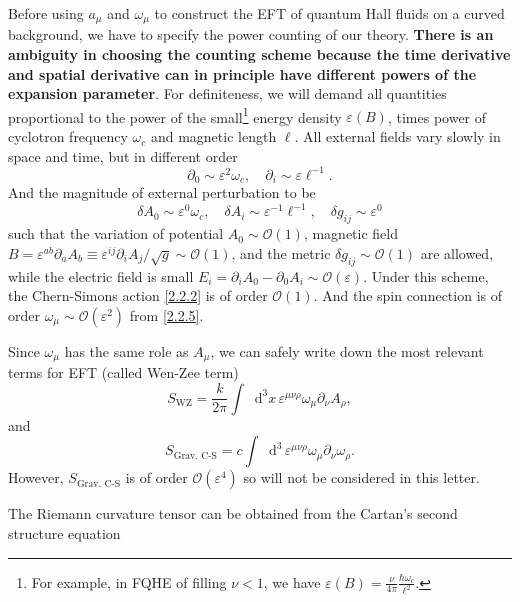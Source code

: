 \documentclass[10pt,nofootinbib,letterpaper]{revtex4}
\newcommand*\dd{\mathop{}\!\mathrm{d}}
\begin{document}
		\indent Before using $a_\mu$ and $\omega_\mu$ to construct the EFT of quantum Hall fluids on a curved background, we have to specify the power counting of our theory. \textbf{There is an ambiguity in choosing the counting scheme because the time derivative and spatial derivative can in principle have different powers of the expansion parameter}. For definiteness, we will demand all quantities proportional to the power of the small\footnote{For example, in FQHE of filling $\nu<1$, we have $\varepsilon(B)=\frac{\nu}{4\pi}\frac{\hbar\omega_c}{\ell^2}$.} energy density $\varepsilon(B)$, times power of cyclotron frequency $\omega_c$ and magnetic length $\ell$. All external fields vary slowly in space and time, but in different order
		\begin{equation*}
			\partial_0\sim \varepsilon^2\omega_c, \quad\partial_i\sim \varepsilon\ell^{-1}.
		\end{equation*}
		And the magnitude of external perturbation to be
		\begin{equation*}
			\delta A_0\sim \varepsilon^0\omega_c,\quad\delta A_i\sim \varepsilon^{-1}\ell^{-1},\quad \delta g_{ij}\sim \varepsilon^0
		\end{equation*}
		such that the variation of potential $A_0\sim\mathcal{O}(1)$, magnetic field $B=\varepsilon^{ab}\partial_a A_b\equiv\varepsilon^{ij}\partial_i A_j/\sqrt{g}\sim\mathcal{O}(1)$, and the metric $\delta g_{ij}\sim\mathcal{O}(1)$ are allowed, while the electric field is small $E_i=\partial_i A_0- \partial_0 A_i\sim\mathcal{O}(\varepsilon)$. Under this scheme, the Chern-Simons action \eqref{2.2.2} is of order $\mathcal{O}(1)$. And the spin connection is of order $\omega_\mu\sim\mathcal{O}(\varepsilon^2)$ from \eqref{2.2.5}.\par
		Since $\omega_\mu$ has the same role as $A_\mu$, we can safely write down the most relevant terms for EFT (called Wen-Zee term)
		\begin{equation}\label{2.2.6}
			S_{\text{WZ}}=\dfrac{k}{2\pi}\int\dd^3x\,\varepsilon^{\mu\nu\rho}\omega_\mu \partial_\nu A_\rho,
		\end{equation}
		and
		\begin{equation}\label{2.2.7}
			S_{\text{Grav. C-S}}=c\int\dd^3\,\varepsilon^{\mu\nu\rho}\omega_\mu \partial_\nu \omega_\rho.
		\end{equation}
		However, $S_{\text{Grav. C-S}}$ is of order $\mathcal{O}(\varepsilon^4)$ so will not be considered in this letter.\par
		The Riemann curvature tensor can be obtained from the Cartan's second structure equation
\end{document}
